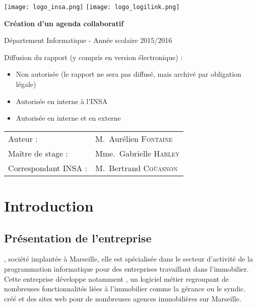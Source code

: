 \documentclass[a4paper, 11pt]{report}
\begin{document}
    \begin{titlepage}
        \texttt{[image: logo\_insa.png]}
        \hspace{0.35\textwidth}
        \texttt{[image: logo\_logilink.png]}
        \begin{center}
            \vspace{7cm}
            {\huge\bfseries Création d'un agenda collaboratif \par}
            \vspace{0.5cm}
            {\Large Département Informatique - Année scolaire 2015/2016\par}
        \end{center}
        \vfill

        Diffusion du rapport (y compris en version électronique) :

        \begin{itemize}[label=$\square$]
            \item Non autorisée (le rapport ne sera pas diffusé, mais archivé par obligation légale)
            \item Autorisée en interne à l’INSA
            \item Autorisée en interne et en externe
        \end{itemize}

        \vspace{0.5cm}

        \begin{tabular}{ll}
            {\Large Auteur :}             & M.~Aurélien \textsc{Fontaine}\\
            {\Large Maître de stage :}    & Mme.~Gabrielle \textsc{Harley}\\
            {\Large Correspondant INSA :} & M.~Bertrand \textsc{Coüasnon}\\
        \end{tabular}
    \end{titlepage}

\tableofcontents

\chapter{Introduction}
\section{Présentation de l'entreprise}
\logilink, société implantée à Marseille, elle est spécialisée dans le secteur d'activité de la programmation informatique pour des entreprises travaillant dans l'immobilier. Cette entreprise développe notamment \ulti, un logiciel métier regroupant de nombreuses fonctionnalités liées à l’immobilier comme la gérance ou le syndic. \logilink créé et des sites web pour de nombreuses agences immobilières sur Marseille.
\end{document}
